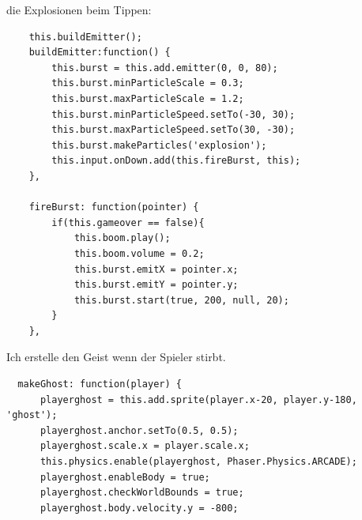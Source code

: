 \documentclass{article}
\begin{document}
die Explosionen beim Tippen:
\begin{lstlisting}
    this.buildEmitter();
    buildEmitter:function() {
        this.burst = this.add.emitter(0, 0, 80);
        this.burst.minParticleScale = 0.3;
        this.burst.maxParticleScale = 1.2;
        this.burst.minParticleSpeed.setTo(-30, 30);
        this.burst.maxParticleSpeed.setTo(30, -30);
        this.burst.makeParticles('explosion');
        this.input.onDown.add(this.fireBurst, this);
    },

    fireBurst: function(pointer) {
        if(this.gameover == false){
            this.boom.play();
            this.boom.volume = 0.2;
            this.burst.emitX = pointer.x;
            this.burst.emitY = pointer.y;
            this.burst.start(true, 200, null, 20);
        }
    },
\end{lstlisting}


Ich erstelle den Geist wenn der Spieler stirbt.

\begin{lstlisting}
  makeGhost: function(player) {
      playerghost = this.add.sprite(player.x-20, player.y-180, 'ghost');
      playerghost.anchor.setTo(0.5, 0.5);
      playerghost.scale.x = player.scale.x;
      this.physics.enable(playerghost, Phaser.Physics.ARCADE);
      playerghost.enableBody = true;
      playerghost.checkWorldBounds = true;
      playerghost.body.velocity.y = -800;
\end{lstlisting}


\cleardoublepage
\end{document}
